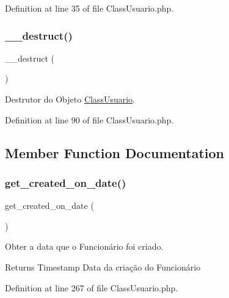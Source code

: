 Definition at line 35 of file Class\+Usuario.\+php.

\mbox{\label{class_class_usuario_a421831a265621325e1fdd19aace0c758}} 
\subsubsection{\texorpdfstring{\+\_\+\+\_\+destruct()}{\_\_destruct()}}
{\footnotesize\ttfamily \+\_\+\+\_\+destruct (\begin{DoxyParamCaption}{ }\end{DoxyParamCaption})}



Destrutor do Objeto \hyperlink{class_class_usuario}{Class\+Usuario}. 



Definition at line 90 of file Class\+Usuario.\+php.



\subsection{Member Function Documentation}
\mbox{\label{class_class_usuario_a9a1ef394f9aef6ab037f8bb37209242f}} 
\subsubsection{\texorpdfstring{get\+\_\+created\+\_\+on\+\_\+date()}{get\_created\_on\_date()}}
{\footnotesize\ttfamily get\+\_\+created\+\_\+on\+\_\+date (\begin{DoxyParamCaption}{ }\end{DoxyParamCaption})}



Obter a data que o Funcionário foi criado. 

\begin{DoxyReturn}{Returns}
Timestamp Data da criação do Funcionário 
\end{DoxyReturn}


Definition at line 267 of file Class\+Usuario.\+php.

